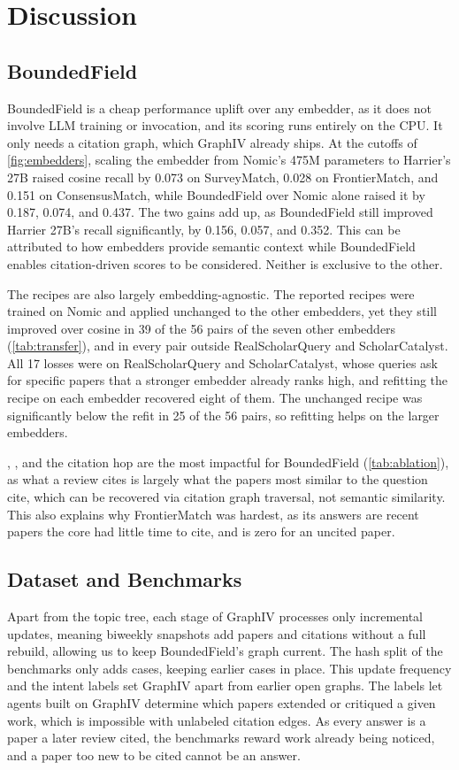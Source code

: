 \section{Discussion}
\label{sec:discussion}

\subsection{BoundedField}
BoundedField is a cheap performance uplift over any embedder, as it does not involve LLM training or invocation, and its scoring runs entirely on the CPU. It only needs a citation graph, which GraphIV already ships. At the cutoffs of \cref{fig:embedders}, scaling the embedder from Nomic's 475M parameters to Harrier's 27B raised cosine recall by 0.073 on SurveyMatch, 0.028 on FrontierMatch, and 0.151 on ConsensusMatch, while BoundedField over Nomic alone raised it by 0.187, 0.074, and 0.437. The two gains add up, as BoundedField still improved Harrier 27B's recall significantly, by 0.156, 0.057, and 0.352. This can be attributed to how embedders provide semantic context while BoundedField enables citation-driven scores to be considered. Neither is exclusive to the other.

The recipes are also largely embedding-agnostic. The reported recipes were trained on Nomic and applied unchanged to the other embedders, yet they still improved over cosine in 39 of the 56 pairs of the seven other embedders (\cref{tab:transfer}), and in every pair outside RealScholarQuery and ScholarCatalyst. All 17 losses were on RealScholarQuery and ScholarCatalyst, whose queries ask for specific papers that a stronger embedder already ranks high, and refitting the  recipe on each embedder recovered eight of them. The unchanged recipe was significantly below the refit in 25 of the 56 pairs, so refitting helps on the larger embedders.

, , and the citation hop are the most impactful for BoundedField (\cref{tab:ablation}), as what a review cites is largely what the papers most similar to the question cite, which can be recovered via citation graph traversal, not semantic similarity. This also explains why FrontierMatch was hardest, as its answers are recent papers the core had little time to cite, and  is zero for an uncited paper.

\subsection{Dataset and Benchmarks}
Apart from the topic tree, each stage of GraphIV processes only incremental updates, meaning biweekly snapshots add papers and citations without a full rebuild, allowing us to keep BoundedField's graph current. The hash split of the benchmarks only adds cases, keeping earlier cases in place. This update frequency and the intent labels set GraphIV apart from earlier open graphs. The labels let agents built on GraphIV determine which papers extended or critiqued a given work, which is impossible with unlabeled citation edges. As every answer is a paper a later review cited, the benchmarks reward work already being noticed, and a paper too new to be cited cannot be an answer.

